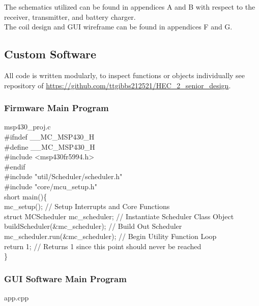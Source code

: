 \documentclass[12pt]{article}
\begin{document}
\noindent
The schematics utilized can be found in appendices A and B with respect to the receiver, transmitter, and battery charger.\\

\noindent
The coil design and GUI wireframe can be found in appendices F and G.

\subsection{Custom Software}

\indent
All code is written modularly, to inspect functions or objects individually see repository of \url{https://github.com/ttgibbs212521/HEC\_2\_senior\_design}. \\

\subsubsection{Firmware Main Program} msp430\_proj.c\\

{\ttfamily
\noindent
\#ifndef \_\_MC\_MSP430\_H\\
\#define \_\_MC\_MSP430\_H\\
\#include <msp430fr5994.h>\\
\#endif\\
\#include "util/Scheduler/scheduler.h"\\
\#include "core/mcu\_setup.h"\\
short main()\{\\
\indent mc\_setup();				// Setup Interrupts and Core Functions\\
\indent struct MCScheduler mc\_scheduler;	// Instantiate Scheduler Class Object\\
\indent buildScheduler(\&mc\_scheduler);	// Build Out Scheduler\\
\indent mc\_scheduler.run(\&mc\_scheduler);	// Begin Utility Function Loop\\
\indent return 1;		// Returns 1 since this point should never be reached\\
\}\\
}
\pagebreak

\subsubsection{GUI Software Main Program} app.cpp\\
\end{document}
